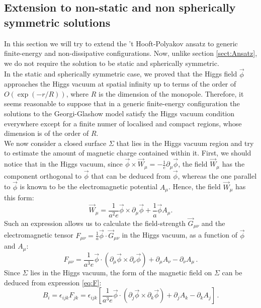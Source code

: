 \documentclass[main.tex]{subfiles}
\begin{document}
\subsection{Extension to non-static and non spherically symmetric solutions}
\label{sect:top}
In this section we will try to extend the 't Hooft-Polyakov ansatz to generic finite-energy and non-dissipative configurations. Now, unlike section \ref{sect:Ansatz}, we do not require the solution to be static and spherically symmetric. \\
In the static and spherically symmetric case, we proved that the Higgs field $\vec{\phi}$ approaches the Higgs vacuum at spatial infinity up to terms of the order of $O(\exp(-r/R))$, where $R$ is the dimension of the monopole.
Therefore, it seems reasonable to suppose that in a generic finite-energy configuration the solutions to the Georgi-Glashow model satisfy the Higgs vacuum condition everywhere except for a finite numer of localised and compact regions, whose dimension is of the order of $R$.\\
We now consider a closed surface $\Sigma$ that lies in the Higgs vacuum region and try to estimate the amount of magnetic charge contained within it. 
First, we should notice that in the Higgs vacuum, since $ \vec{\phi} \times \vec{W}_\mu = - \frac{1}{e} \partial_\mu \vec{\phi}$, the field $\vec{W}_\mu $ has the component orthogonal to $\vec{\phi}$ that can be deduced from $\vec{\phi}$, whereas the one parallel to $\vec{\phi}$ is known to be the electromagnetic potential $A_\mu$. Hence, the field $\vec{W}_{\mu}$ has this form: 
\begin{equation}
\vec{W}_{\mu} = \frac{1}{a^2 e} \vec{\phi} \times \partial_\mu \vec{\phi} + \frac{1}{a}\vec{\phi} A_\mu . 
\end{equation}
Such an expression allows us to calculate the field-strength $\vec{G}_{\mu \nu}$ and the electromagnetic tensor $F_{\mu \nu} = \frac{1}{a} \vec{\phi}\cdot \vec{G}_{\mu \nu}$ in the Higgs vacuum, as a function of $\vec{\phi}$ and $A_\mu$: 
\begin{equation}
F_{\mu \nu}  = \frac{1}{a^3 e}\vec{\phi}\cdot \left(  \partial_\mu \vec{\phi}  \times  \partial_\nu \vec{\phi} \right) + \partial_\mu A_\nu -\partial_\nu A_\mu \,.
\label{eq:F}
\end{equation}
Since $\Sigma $ lies in the Higgs vacuum, the form of the magnetic field on $\Sigma$ can be deduced from expression \eqref{eq:F}:
\begin{equation}
B_i = \epsilon_{ijk} F_{jk} =   \epsilon_{ijk} \left[ \frac{1}{a^3 e} \vec{\phi}\cdot \left(  \partial_j \vec{\phi}  \times  \partial_k \vec{\phi} \right) + \partial_j A_k -\partial_k A_j \right]\,.
\end{equation}
\end{document}

